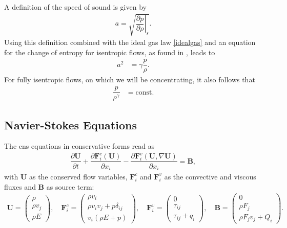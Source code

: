 		A definition of the speed of sound is given by
		\begin{align}
			a = \sqrt{\left.\dfrac{\partial p}{\partial \rho}\right|_s}.
		\end{align}
		Using this definition combined with the ideal gas law \eqref{idealgas} and an equation for the change of entropy for isentropic flows, as found in \textcite{mueller2014}, leads to
		\begin{align}
			a^2 &= \gamma \dfrac{p}{\rho}.
		\end{align}
		For fully isentropic flows, on which we will be concentrating, it also follows that 
		\begin{align}
				\dfrac{p}{\rho^\gamma} &= \text{const}.
		\end{align}
		
		\subsection{Navier-Stokes Equations}
		The \gls{cns} equations in conservative forms read as 
		\begin{align}
			\dfrac{\partial \mathbf{U}}{\partial t} + \dfrac{\partial \mathbf{F}_i^c(\mathbf{U})}{\partial x_i} - \dfrac{\partial \mathbf{F}_i^v(\mathbf{U}, \nabla\mathbf{U})}{\partial x_i} = \mathbf{B},
		\end{align}
		with $\mathbf{U}$ as the conserved flow variables, $\mathbf{F}_i^c$ and $\mathbf{F}_i^v$ as the convective and viscous fluxes and $\mathbf{B}$ as source term:
		\begin{align}
			\mathbf{U} = 
				\begin{pmatrix}
				\rho \\
				\rho v_j \\
				\rho E
				\end{pmatrix} , \quad
			\mathbf{F}_i^c = 
				\begin{pmatrix}
				\rho v_i \\
				\rho v_i v_j + p \delta_{ij}\\
				v_i(\rho E + p)
				\end{pmatrix} , \quad
			\mathbf{F}_i^v = 
				\begin{pmatrix}
				0 \\
				\tau_{ij}\\
				\tau_{ij} + q_i
				\end{pmatrix} , \quad
			\mathbf{B} = 
				\begin{pmatrix}
				0 \\
				\rho F_j\\
				\rho F_j v_j + Q_i
				\end{pmatrix}.
		\end{align}
